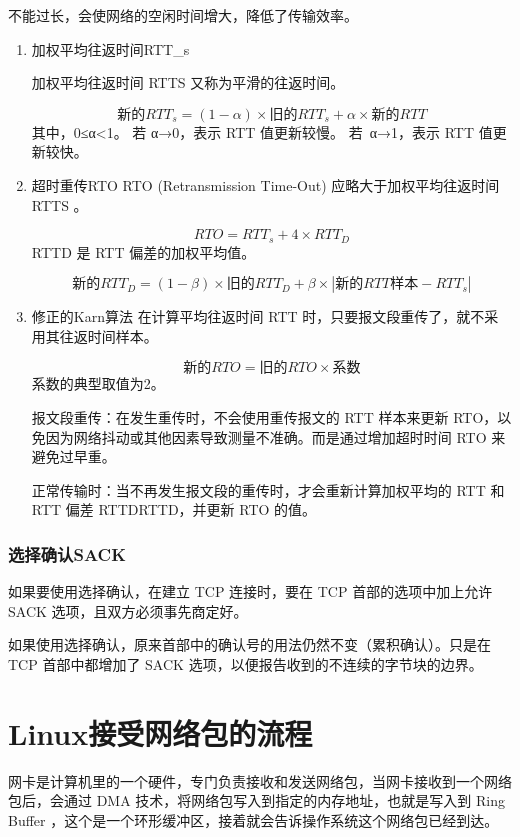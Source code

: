 \documentclass[11pt]{article}
\begin{document}
不能过长，会使网络的空闲时间增大，降低了传输效率。

\begin{enumerate}
\item 加权平均往返时间RTT\_s
\label{sec:org6c26077}

加权平均往返时间 RTTS 又称为平滑的往返时间。

\[
  新的RTT_s = (1-\alpha) \times 旧的RTT_s + \alpha \times 新的RTT
\]
其中，0≤α<1。
若 α→0，表示 RTT 值更新较慢。
若 α→1，表示 RTT 值更新较快。
\item 超时重传RTO
\label{sec:org35e287f}
RTO (Retransmission Time-Out) 应略大于加权平均往返时间 RTTS 。

\[
  RTO=RTT_s + 4 \times RTT_D
\]
RTTD 是 RTT 偏差的加权平均值。

\[
  新的RTT_D=(1- \beta) \times 旧的RTT_D+ \beta \times |新的RTT样本-RTT_s|
\]

\item 修正的Karn算法
\label{sec:org2330631}
在计算平均往返时间 RTT 时，只要报文段重传了，就不采用其往返时间样本。

\[
  新的RTO=旧的RTO \times 系数
\]
系数的典型取值为2。

报文段重传：在发生重传时，不会使用重传报文的 RTT 样本来更新 RTO，以免因为网络抖动或其他因素导致测量不准确。而是通过增加超时时间 RTO 来避免过早重。

正常传输时：当不再发生报文段的重传时，才会重新计算加权平均的 RTT 和 RTT 偏差 RTTDRTTD​，并更新 RTO 的值。
\end{enumerate}
\subsubsection{选择确认SACK}
\label{sec:org717e47e}
如果要使用选择确认，在建立 TCP 连接时，要在 TCP 首部的选项中加上允许 SACK 选项，且双方必须事先商定好。

如果使用选择确认，原来首部中的确认号的用法仍然不变（累积确认）。只是在 TCP 首部中都增加了 SACK 选项，以便报告收到的不连续的字节块的边界。


\section{Linux接受网络包的流程}
\label{sec:orgbe285a0}

网卡是计算机里的一个硬件，专门负责接收和发送网络包，当网卡接收到一个网络包后，会通过 DMA 技术，将网络包写入到指定的内存地址，也就是写入到 Ring Buffer ，这个是一个环形缓冲区，接着就会告诉操作系统这个网络包已经到达。
\end{document}
